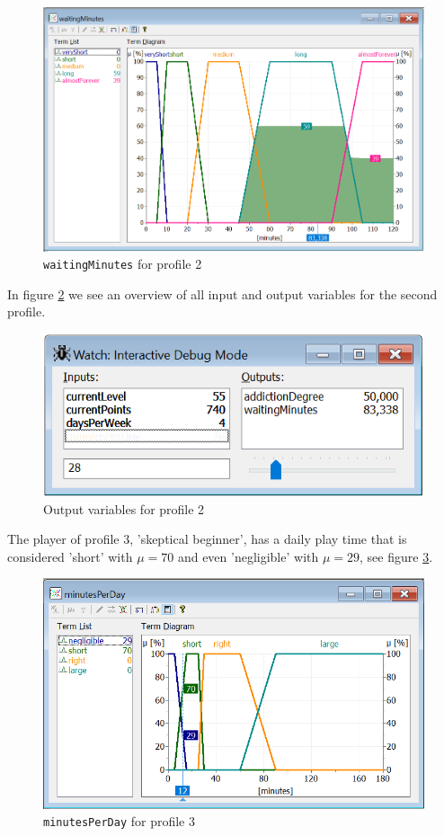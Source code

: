 \begin{figure}[H]
\centering
\includegraphics[width=\textwidth]{img/profile2_vWaitingMinutes}
\caption{\texttt{waitingMinutes} for profile 2}
\label{fig:p2wm} 
\end{figure}

In figure \ref{fig:prof2} we see an overview of all input and output variables for the second profile.

\begin{figure}[H]
\centering
\includegraphics[width=\textwidth]{img/profile2}
\caption{Output variables for profile 2}
\label{fig:prof2} 
\end{figure}

The player of profile 3, 'skeptical beginner', has a daily play time that is considered 'short' with $\mu=70$ and even 'negligible' with $\mu=29$, see figure \ref{fig:p3mpd}.

\begin{figure}[H]
\centering
\includegraphics[width=\textwidth]{img/profile3_vMinutesPerDay}
\caption{\texttt{minutesPerDay} for profile 3}
\label{fig:p3mpd} 
\end{figure}

